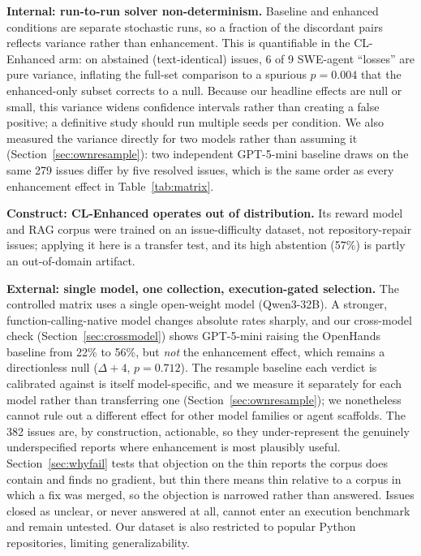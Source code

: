 \documentclass[journal]{IEEEtran}
\newcommand{\ourmethod}{CL-Enhanced}
\begin{document}
\textbf{Internal: run-to-run solver non-determinism.} Baseline and enhanced conditions are separate stochastic runs, so a fraction of the discordant pairs reflects variance rather than enhancement. This is quantifiable in the \ourmethod{} arm: on abstained (text-identical) issues, 6 of 9 SWE-agent ``losses'' are pure variance, inflating the full-set comparison to a spurious $p=0.004$ that the enhanced-only subset corrects to a null. Because our headline effects are null or small, this variance widens confidence intervals rather than creating a false positive; a definitive study should run multiple seeds per condition. We also measured the variance directly for two models rather than assuming it (Section~\ref{sec:ownresample}): two independent GPT-5-mini baseline draws on the same 279 issues differ by five resolved issues, which is the same order as every enhancement effect in Table~\ref{tab:matrix}.

\textbf{Construct: \ourmethod{} operates out of distribution.} Its reward model and RAG corpus were trained on an issue-difficulty dataset, not repository-repair issues; applying it here is a transfer test, and its high abstention (57\%) is partly an out-of-domain artifact.

\textbf{External: single model, one collection, execution-gated selection.} The controlled matrix uses a single open-weight model (Qwen3-32B). A stronger, function-calling-native model changes absolute rates sharply, and our cross-model check (Section~\ref{sec:crossmodel}) shows GPT-5-mini raising the OpenHands baseline from 22\% to 56\%, but \emph{not} the enhancement effect, which remains a directionless null ($\Delta{+}4$, $p=0.712$). The resample baseline each verdict is calibrated against is itself model-specific, and we measure it separately for each model rather than transferring one (Section~\ref{sec:ownresample}); we nonetheless cannot rule out a different effect for other model families or agent scaffolds. The 382 issues are, by construction, actionable, so they under-represent the genuinely underspecified reports where enhancement is most plausibly useful. Section~\ref{sec:whyfail} tests that objection on the thin reports the corpus does contain and finds no gradient, but thin there means thin relative to a corpus in which a fix was merged, so the objection is narrowed rather than answered. Issues closed as unclear, or never answered at all, cannot enter an execution benchmark and remain untested. Our dataset is also restricted to popular Python repositories, limiting generalizability.
\end{document}
